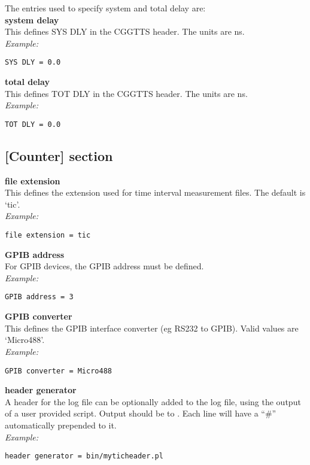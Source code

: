 The entries used to specify system and total delay are:\\

{\bfseries system delay}\\
This defines SYS DLY in the CGGTTS header. The units are ns.\\
\textit{Example:}
\begin{lstlisting}
SYS DLY = 0.0
\end{lstlisting}

{\bfseries total delay}\\
This defines TOT DLY in the CGGTTS header. The units are ns.\\
\textit{Example:}
\begin{lstlisting}
TOT DLY = 0.0
\end{lstlisting}

\subsection{[Counter] section}

\hypertarget{h:counter}{}

{\bfseries file extension}\\
This defines the extension used for time interval measurement files.
The default is `tic'.\\
\textit{Example:}
\begin{lstlisting}
file extension = tic
\end{lstlisting}

{\bfseries GPIB address}\\
For GPIB devices, the GPIB address must be defined.\\
\textit{Example:}
\begin{lstlisting}
GPIB address = 3
\end{lstlisting}

{\bfseries GPIB converter}\\
This defines the GPIB interface converter (eg RS232 to GPIB).
Valid values are `Micro488'.\\
\textit{Example:}
\begin{lstlisting}
GPIB converter = Micro488
\end{lstlisting}

{\bfseries header generator}\\
A header for the log file can be optionally added to the log file, using the output
of a user provided script. Output should be to .
Each line will have a ``\#'' automatically prepended to it.\\
\textit{Example:}
\begin{lstlisting}
header generator = bin/myticheader.pl
\end{lstlisting}

